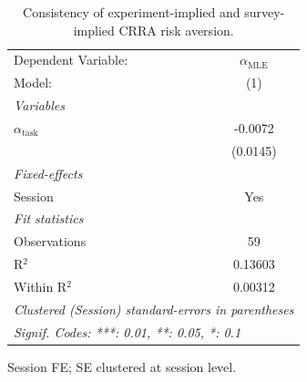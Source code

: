 
\begin{table}[htbp]
   \caption{\label{tab:risk_aversion_consistency} Consistency of experiment-implied and survey-implied CRRA risk aversion.}
   \centering
   \begin{tabular}{lc}
      \tabularnewline \midrule \midrule
      Dependent Variable:      & $\alpha_{\text{MLE}}$\\    
      Model:                   & (1)\\  
      \midrule
      \emph{Variables}\\
      $\alpha_{\text{task}}$   & -0.0072\\   
                               & (0.0145)\\   
      \midrule
      \emph{Fixed-effects}\\
      Session                  & Yes\\  
      \midrule
      \emph{Fit statistics}\\
      Observations             & 59\\  
      R$^2$                    & 0.13603\\  
      Within R$^2$             & 0.00312\\  
      \midrule \midrule
      \multicolumn{2}{l}{\emph{Clustered (Session) standard-errors in parentheses}}\\
      \multicolumn{2}{l}{\emph{Signif. Codes: ***: 0.01, **: 0.05, *: 0.1}}\\
   \end{tabular}
   
   \par \raggedright 
   Session FE; SE clustered at session level.
\end{table}


